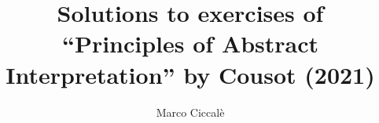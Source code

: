 \documentclass[10pt,justified,nofonts]{tufte-handout}
\title{Solutions to exercises of ``Principles of Abstract Interpretation'' by Cousot (2021)}
\author{Marco Ciccal{\`{e}}}
\begin{document}
%
\maketitle
%

{}



\end{document}
